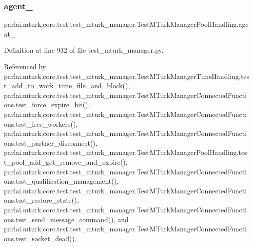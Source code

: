 \subsubsection{\texorpdfstring{agent\+\_}{agent\_1}}
{\footnotesize\ttfamily parlai.\+mturk.\+core.\+test.\+test\+\_\+mturk\+\_\+manager.\+Test\+M\+Turk\+Manager\+Pool\+Handling.\+agent\+\_}



Definition at line 932 of file test\+\_\+mturk\+\_\+manager.\+py.



Referenced by parlai.\+mturk.\+core.\+test.\+test\+\_\+mturk\+\_\+manager.\+Test\+M\+Turk\+Manager\+Time\+Handling.\+test\+\_\+add\+\_\+to\+\_\+work\+\_\+time\+\_\+file\+\_\+and\+\_\+block(), parlai.\+mturk.\+core.\+test.\+test\+\_\+mturk\+\_\+manager.\+Test\+M\+Turk\+Manager\+Connected\+Functions.\+test\+\_\+force\+\_\+expire\+\_\+hit(), parlai.\+mturk.\+core.\+test.\+test\+\_\+mturk\+\_\+manager.\+Test\+M\+Turk\+Manager\+Connected\+Functions.\+test\+\_\+free\+\_\+workers(), parlai.\+mturk.\+core.\+test.\+test\+\_\+mturk\+\_\+manager.\+Test\+M\+Turk\+Manager\+Connected\+Functions.\+test\+\_\+partner\+\_\+disconnect(), parlai.\+mturk.\+core.\+test.\+test\+\_\+mturk\+\_\+manager.\+Test\+M\+Turk\+Manager\+Pool\+Handling.\+test\+\_\+pool\+\_\+add\+\_\+get\+\_\+remove\+\_\+and\+\_\+expire(), parlai.\+mturk.\+core.\+test.\+test\+\_\+mturk\+\_\+manager.\+Test\+M\+Turk\+Manager\+Connected\+Functions.\+test\+\_\+qualification\+\_\+management(), parlai.\+mturk.\+core.\+test.\+test\+\_\+mturk\+\_\+manager.\+Test\+M\+Turk\+Manager\+Connected\+Functions.\+test\+\_\+restore\+\_\+state(), parlai.\+mturk.\+core.\+test.\+test\+\_\+mturk\+\_\+manager.\+Test\+M\+Turk\+Manager\+Connected\+Functions.\+test\+\_\+send\+\_\+message\+\_\+command(), and parlai.\+mturk.\+core.\+test.\+test\+\_\+mturk\+\_\+manager.\+Test\+M\+Turk\+Manager\+Connected\+Functions.\+test\+\_\+socket\+\_\+dead().

\mbox{\label{classparlai_1_1mturk_1_1core_1_1test_1_1test__mturk__manager_1_1TestMTurkManagerPoolHandling_afed656e088daad95505051c01e86c2c0}} 
